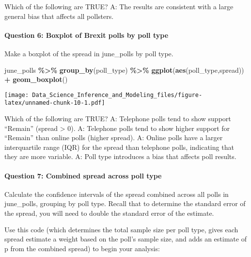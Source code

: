 \documentclass[
]{article}
\newenvironment{Shaded}{\begin{snugshade}}{\end{snugshade}}
\newcommand{\KeywordTok}[1]{\textcolor[rgb]{0.13,0.29,0.53}{\textbf{#1}}}
\newcommand{\NormalTok}[1]{#1}
\newcommand{\OperatorTok}[1]{\textcolor[rgb]{0.81,0.36,0.00}{\textbf{#1}}}
\newcommand{\StringTok}[1]{\textcolor[rgb]{0.31,0.60,0.02}{#1}}
\begin{document}
Which of the following are TRUE? A: The results are consistent with a
large general bias that affects all pollsters.

\hypertarget{question-6-boxplot-of-brexit-polls-by-poll-type}{%
\paragraph{Question 6: Boxplot of Brexit polls by poll
type}\label{question-6-boxplot-of-brexit-polls-by-poll-type}}

Make a boxplot of the spread in june\_polls by poll type.

\begin{Shaded}
\begin{Highlighting}[]
\NormalTok{june\_polls }\OperatorTok{\%\textgreater{}\%}\StringTok{ }\KeywordTok{group\_by}\NormalTok{(poll\_type) }\OperatorTok{\%\textgreater{}\%}
\StringTok{  }\KeywordTok{ggplot}\NormalTok{(}\KeywordTok{aes}\NormalTok{(poll\_type,spread)) }\OperatorTok{+}
\StringTok{  }\KeywordTok{geom\_boxplot}\NormalTok{()}
\end{Highlighting}
\end{Shaded}

\texttt{[image: Data\_Science\_Inference\_and\_Modeling\_files/figure-latex/unnamed-chunk-10-1.pdf]}

Which of the following are TRUE? A: Telephone polls tend to show support
``Remain'' (spread \textgreater{} 0). A: Telephone polls tend to show
higher support for ``Remain'' than online polls (higher spread). A:
Online polls have a larger interquartile range (IQR) for the spread than
telephone polls, indicating that they are more variable. A: Poll type
introduces a bias that affects poll results.

\hypertarget{question-7-combined-spread-across-poll-type}{%
\paragraph{Question 7: Combined spread across poll
type}\label{question-7-combined-spread-across-poll-type}}

Calculate the confidence intervals of the spread combined across all
polls in june\_polls, grouping by poll type. Recall that to determine
the standard error of the spread, you will need to double the standard
error of the estimate.

Use this code (which determines the total sample size per poll type,
gives each spread estimate a weight based on the poll's sample size, and
adds an estimate of p from the combined spread) to begin your analysis:
\end{document}
